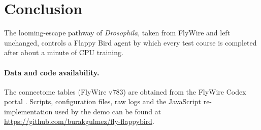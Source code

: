 \documentclass[11pt]{article}
\begin{document}
\section{Conclusion}
The looming-escape pathway of \textit{Drosophila}, taken from FlyWire and left unchanged, controls a
Flappy Bird agent by which every test course is completed after about a minute of CPU training.

\paragraph{Data and code availability.} The connectome tables (FlyWire v783) are obtained from the
FlyWire Codex portal \cite{dorkenwald2024}. Scripts, configuration files, raw logs and the JavaScript
re-implementation used by the demo can be found at
\url{https://github.com/burakgulmez/fly-flappybird}.



\end{document}
